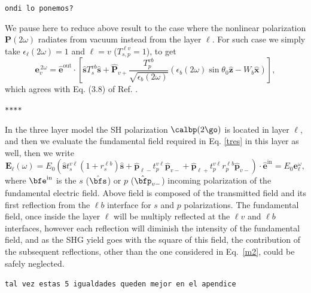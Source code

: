 \documentclass[aps,11pt]{revtex4}
\begin{document}
\verb=ondi lo ponemos?=

We pause here to reduce above result to the case where the nonlinear
polarization $\mathbf{P}(2\omega)$ radiates from vacuum instead from the layer
$\ell$. For such case we simply take $\epsilon_{\ell}(2\omega)=1$ and $\ell=v$
($T^{\ell v}_{s,p}=1$), to get
\begin{equation}\label{r13}
\mathbf{e}^{\,2\omega}_{v} = \hat{\mathbf{e}}^{\mathrm{out}}
\cdot\left[
\hat{\mathbf{s}}T_s^{v b}\hat{\mathbf{s}} + \hat{\mathbf{P}}_{v+}
\frac{T^{v b}_{p}}{\sqrt{\epsilon_{b}(2\omega)}}
\left(
  \epsilon_{b}(2\omega)\sin\theta_0\hat{\mathbf{z}}
  - W_{b}\hat{\mathbf{x}}
\right) 
\right] 
,
\end{equation}
which agrees with Eq. (3.8) of Ref. \cite{mizrahiJOSA88}.

\verb=****=

In the three layer model the SH polarization $\calbp(2\go)$ is located in layer $\ell$,
and then we evaluate the fundamental field required in Eq. \eqref{tres} in this
layer as well, then we write
\begin{equation}\label{m2}
\mathbf{E}_{\ell}(\omega)=E_0\left(
\hat{\mathbf{s}} t^{v\ell}_s(1+r^{\ell b}_s)\hat{\mathbf{s}}
+
\hat{\mathbf{p}}_{\ell-}
 t^{v\ell}_{p}
\hat{\mathbf{p}}_{v-}
+
\hat{\mathbf{p}}_{\ell+}
t^{v\ell}_{p}r^{\ell b}_{p}
\hat{\mathbf{p}}_{v-}
\right)\cdot\hat{\mathbf{e}}^{\mathrm{in}}=E_0\mathbf{e}^\omega_{\ell}
,
\end{equation} 
where $\bfe^{\mathrm{in}}$ is the $s$ ($\hat\bfs$) or $p$
($\hat\bfp_{v-}$)
incoming polarization of
the fundamental electric field. 
Above field is composed of the transmitted field and its first
reflection from the $\ell b$ interface for $s$ and $p$ polarizations.
The fundamental field, once inside the layer $\ell$ will be multiply
reflected at the $\ell v$ and $\ell b$ interfaces, however each
reflection will diminish the intensity of the fundamental field, and as the SHG
yield goes with the square of this field, the contribution of the
subsequent reflections, other than the one considered in
Eq.~\eqref{m2},  could be safely neglected.

\verb=tal vez estas 5 igualdades queden mejor en el apendice =
\end{document}
